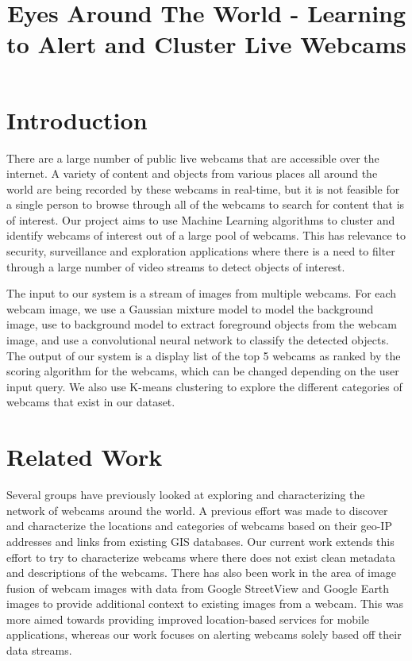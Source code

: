 \documentclass[10pt]{article} %
\title{Eyes Around The World - Learning to Alert and Cluster Live Webcams}
\begin{document}
\maketitle
\section{Introduction}
There are a large number of public live webcams that are accessible over the internet. A variety of content and objects from various places all around the world are being recorded by these webcams in real-time, but it is not feasible for a single person to browse through all of the webcams to search for content that is of interest. Our project aims to use Machine Learning algorithms to cluster and identify webcams of interest out of a large pool of webcams. This has relevance to security, surveillance and exploration applications where there is a need to filter through a large number of video streams to detect objects of interest. 

The input to our system is a stream of images from multiple webcams. For each webcam image, we use a Gaussian mixture model to model the background image, use to background model to extract foreground objects from the webcam image, and use a convolutional neural network to classify the detected objects. The output of our system is a display list of the top 5 webcams as ranked by the scoring algorithm for the webcams, which can be changed depending on the user input query. We also use K-means clustering to explore the different categories of webcams that exist in our dataset. 

\section{Related Work}
Several groups have previously looked at exploring and characterizing the network of webcams around the world. A previous effort was made to discover and characterize the locations and categories of webcams \cite{webcamnetwork} based on their geo-IP addresses and links from existing GIS databases. Our current work extends this effort to try to characterize webcams where there does not exist clean metadata and descriptions of the webcams. There has also been work in the area of image fusion \cite{billioneyes} of webcam images with data from Google StreetView and Google Earth images to provide additional context to existing images from a webcam. This was more aimed towards providing improved location-based services for mobile applications, whereas our work focuses on alerting webcams solely based off their data streams. 
\end{document}
